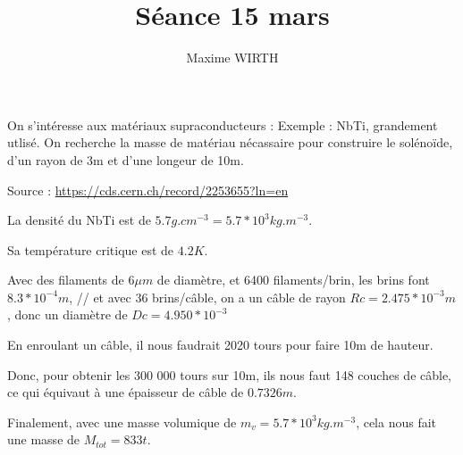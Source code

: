 \documentclass{article}
\author{Maxime WIRTH}
\title{Séance 15 mars}
\begin{document}
\maketitle

On s'intéresse aux matériaux supraconducteurs :
Exemple : NbTi, grandement utlisé.
On recherche la masse de matériau nécassaire pour construire le solénoïde, d'un rayon de 3m et d'une longeur de 10m.

Source : \url{https://cds.cern.ch/record/2253655?ln=en}

La densité du NbTi est de $5.7 g.cm^{-3} = 5.7*10^3 kg.m^{-3}$.

Sa température critique est de $4.2K$.

Avec des filaments de $6 {\mu}m$ de diamètre, et 6400 filaments/brin, les brins font $8.3 * 10^{-4} m$, //
et  avec 36 brins/câble, on a un câble de rayon $Rc = 2.475*10^{-3} m$, donc un diamètre de $Dc = 4.950*10^{-3}$

En enroulant un câble, il nous faudrait 2020 tours pour faire 10m de hauteur.

Donc, pour obtenir les 300 000 tours sur 10m, ils nous faut 148 couches de câble, ce qui équivaut à une épaisseur de câble de
$0.7326 m$.

Finalement, avec une masse volumique de $m_v = 5.7*10^3 kg.m^{-3}$, cela nous fait une masse de $M_{tot} = 833t$.
\end{document}
